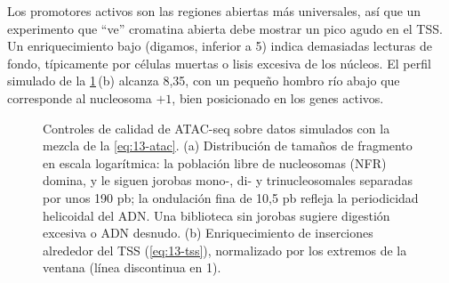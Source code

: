Los promotores activos son las regiones abiertas más universales, así que un experimento que ``ve'' cromatina abierta debe mostrar un pico agudo en el TSS. Un enriquecimiento bajo (digamos, inferior a 5) indica demasiadas lecturas de fondo, típicamente por células muertas o lisis excesiva de los núcleos. El perfil simulado de la \cref{fig:13-atac}\,(b) alcanza 8,35, con un pequeño hombro río abajo que corresponde al nucleosoma $+1$, bien posicionado en los genes activos.

\begin{figure}[t]
\centering
{}
\caption[Controles de calidad de ATAC-seq]{Controles de calidad de ATAC-seq sobre datos simulados con la mezcla de la \cref{eq:13-atac}. (a) Distribución de tamaños de fragmento en escala logarítmica: la población libre de nucleosomas (NFR) domina, y le siguen jorobas mono-, di- y trinucleosomales separadas por unos 190 pb; la ondulación fina de 10,5 pb refleja la periodicidad helicoidal del ADN. Una biblioteca sin jorobas sugiere digestión excesiva o ADN desnudo. (b) Enriquecimiento de inserciones alrededor del TSS (\cref{eq:13-tss}), normalizado por los extremos de la ventana (línea discontinua en 1).}
\label{fig:13-atac}
\end{figure}


